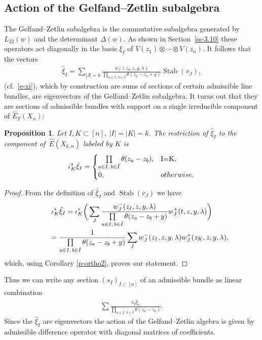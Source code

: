 \documentclass[pdftex]{sigma}
\numberwithin{equation}{section}
\newtheorem{Proposition}[Theorem]{Proposition}
 { \theoremstyle{definition}
\newtheorem{Definition}[Theorem]{Definition}
\newtheorem{Example}[Theorem]{Example}
\newtheorem{Remark}[Theorem]{Remark} }
\begin{document}
\subsection{Action of the Gelfand--Zetlin subalgebra}\label{ss-6.1}
The Gelfand--Zetlin subalgebra is the commutative subalgebra generated by $L_{22}(w)$ and the determinant $\Delta(w)$. As shown in Section~\ref{ss-3.10} these operators act diagonally in the basis $\xi_I$ of $V(z_1)\otimes\cdots\otimes V(z_n)$. It follows that the vectors
\begin{gather*}
 \hat\xi_I=\sum_{|J|=k}\frac{w^-_J(z_I,z,y,\lambda)}{\prod\limits_{a\in I,\,b\in\bar I}\theta(z_a-z_b+y)} \operatorname{Stab}(v_J),
\end{gather*}
(cf.~\eqref{e-xi}), which by construction are sums of sections of certain admissible line bundles, are eigenvectors of the Gelfand--Zetlin subalgebra. It turns out that they are sections of admissible bundles with support on a single irreducible component of $\hat E_T(X_n)$:
\begin{Proposition} Let $I,K\subset [n]$, $|I|=|K|=k$. The restriction of $\hat\xi_I$ to the component of~$\hat E(X_{k,n})$ labeled by $K$ is
\begin{gather*}
\iota_K^*\hat\xi_I= \begin{cases} \prod\limits_{a\in I,\,b\in\bar I}\theta(z_a-z_b),& $I=K$,\\
0,& otherwise.
\end{cases}
\end{gather*}
\end{Proposition}
\begin{proof} From the definition of $\hat\xi_I$ and $\operatorname{Stab}(v_J)$ we have
\begin{gather*}
\iota_K^*\hat\xi_I =\iota_K^*\bigg(\sum_J \frac{ w_J^-(z_I,z,y,\lambda)}{\prod\limits_{a\in I, \,b\in \bar{I}} \theta(z_a-z_b+y)} w^+_J(t,z,y,\lambda) \bigg) \\
\hphantom{\iota_K^*\hat\xi_I}{} =\frac{1}{\prod\limits_{a\in I,\, b\in \bar{I}}\theta(z_a-z_b+y)} \sum_J w_J^-(z_I,z,y,\lambda) w^+_J(z_K,z,y,\lambda),
\end{gather*}
which, using Corollary \ref{p-ortho2}, proves our statement.
\end{proof}

Thus we can write any section $(s_I)_{I\subset[n]}$ of an admissible bundle as linear combination
\begin{gather*}
\sum \frac{s_I\hat\xi_I}{\prod\limits_{a\in I,\,b\in\bar I}\theta(z_a-z_b)}.\end{gather*}
Since the $\hat\xi_I$ are eigenvectors the action of the Gelfand--Zetlin algebra is given by admissible difference operator with diagonal matrices of coefficients.
\end{document}

